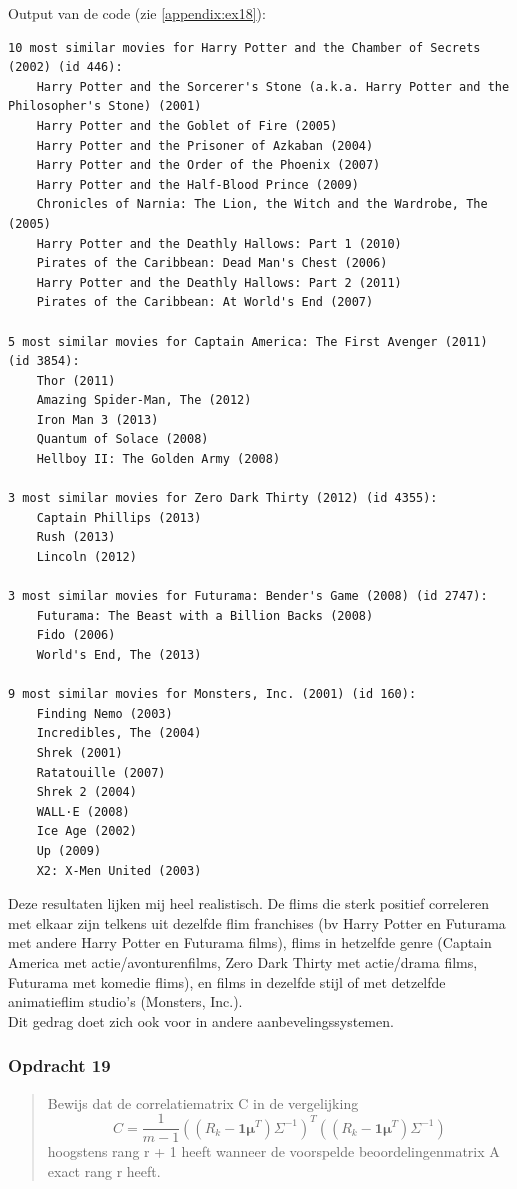 \documentclass[11pt, a4paper, titlepage, openright]{article}
\begin{document}
	Output van de code (zie \ref{appendix:ex18}):
\begin{lstlisting}
10 most similar movies for Harry Potter and the Chamber of Secrets (2002) (id 446):
    Harry Potter and the Sorcerer's Stone (a.k.a. Harry Potter and the Philosopher's Stone) (2001)
    Harry Potter and the Goblet of Fire (2005)
    Harry Potter and the Prisoner of Azkaban (2004)
    Harry Potter and the Order of the Phoenix (2007)
    Harry Potter and the Half-Blood Prince (2009)
    Chronicles of Narnia: The Lion, the Witch and the Wardrobe, The (2005)
    Harry Potter and the Deathly Hallows: Part 1 (2010)
    Pirates of the Caribbean: Dead Man's Chest (2006)
    Harry Potter and the Deathly Hallows: Part 2 (2011)
    Pirates of the Caribbean: At World's End (2007)

5 most similar movies for Captain America: The First Avenger (2011) (id 3854):
    Thor (2011)
    Amazing Spider-Man, The (2012)
    Iron Man 3 (2013)
    Quantum of Solace (2008)
    Hellboy II: The Golden Army (2008)

3 most similar movies for Zero Dark Thirty (2012) (id 4355):
    Captain Phillips (2013)
    Rush (2013)
    Lincoln (2012)

3 most similar movies for Futurama: Bender's Game (2008) (id 2747):
    Futurama: The Beast with a Billion Backs (2008)
    Fido (2006)
    World's End, The (2013)

9 most similar movies for Monsters, Inc. (2001) (id 160):
    Finding Nemo (2003)
    Incredibles, The (2004)
    Shrek (2001)
    Ratatouille (2007)
    Shrek 2 (2004)
    WALL·E (2008)
    Ice Age (2002)
    Up (2009)
    X2: X-Men United (2003)
\end{lstlisting}

    Deze resultaten lijken mij heel realistisch. De flims die sterk positief correleren met elkaar zijn telkens
    uit dezelfde flim franchises (bv Harry Potter en Futurama met andere Harry Potter en Futurama films),
    flims in hetzelfde genre (Captain America met actie/avonturenfilms, Zero Dark Thirty met actie/drama films, Futurama met komedie flims),
    en films in dezelfde stijl of met detzelfde animatieflim studio's (Monsters, Inc.). \\
    Dit gedrag doet zich ook voor in andere aanbevelingssystemen.

	\subsubsection{Opdracht 19}
    \begin{quote}
        Bewijs dat de correlatiematrix C in de vergelijking
        \[ C = \frac{1}{m - 1} ((R_k - \boldsymbol{1}\boldsymbol{\mu}^T) \Sigma^{-1})^T ((R_k - \boldsymbol{1}\boldsymbol{\mu}^T) \Sigma^{-1}) \]
        hoogstens rang r + 1 heeft wanneer de voorspelde beoordelingenmatrix
        A exact rang r heeft.
    \end{quote}
\end{document}

